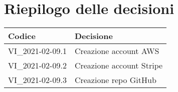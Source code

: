 \section{Riepilogo delle decisioni}
\setcounter{table}{-1}
{

\centering
\renewcommand{\arraystretch}{1.5}
\begin{longtable}{>{\centering}p{} >{}p{}}
\rowcolor{azzurro1}
\textbf{Codice} &
\centerline{\textbf{Decisione}}\\
\endhead

VI{\_}2021-02-09.1 & Creazione account AWS\\
VI{\_}2021-02-09.2 & Creazione account Stripe\\
VI{\_}2021-02-09.3 & Creazione repo GitHub\\
\end{longtable}
}